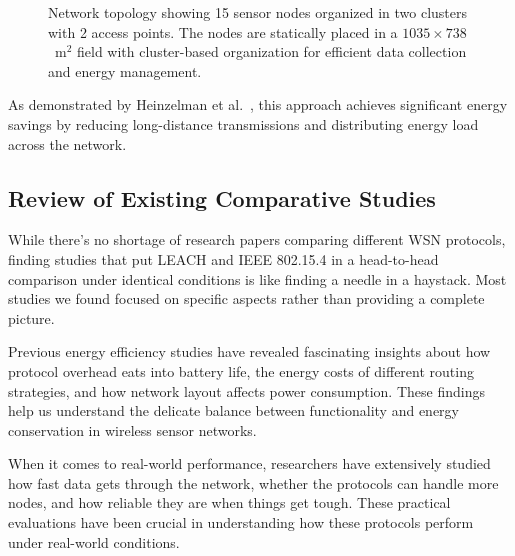 \documentclass[conference]{IEEEtran}
\begin{document}
\begin{figure}[!t]
\caption{Network topology showing 15 sensor nodes organized in two clusters with 2 access points. The nodes are statically placed in a $1035 \times 738$~m$^2$ field with cluster-based organization for efficient data collection and energy management.}
\label{fig:topology}
\end{figure}

As demonstrated by Heinzelman et al.~\cite{leach_orig}, this approach achieves significant energy savings by reducing long-distance transmissions and distributing energy load across the network.


\subsection{Review of Existing Comparative Studies}
While there's no shortage of research papers comparing different WSN protocols, finding studies that put LEACH and IEEE 802.15.4 in a head-to-head comparison under identical conditions is like finding a needle in a haystack. Most studies we found focused on specific aspects rather than providing a complete picture.

Previous energy efficiency studies have revealed fascinating insights about how protocol overhead eats into battery life, the energy costs of different routing strategies, and how network layout affects power consumption. These findings help us understand the delicate balance between functionality and energy conservation in wireless sensor networks.

When it comes to real-world performance, researchers have extensively studied how fast data gets through the network, whether the protocols can handle more nodes, and how reliable they are when things get tough. These practical evaluations have been crucial in understanding how these protocols perform under real-world conditions.
\end{document}

